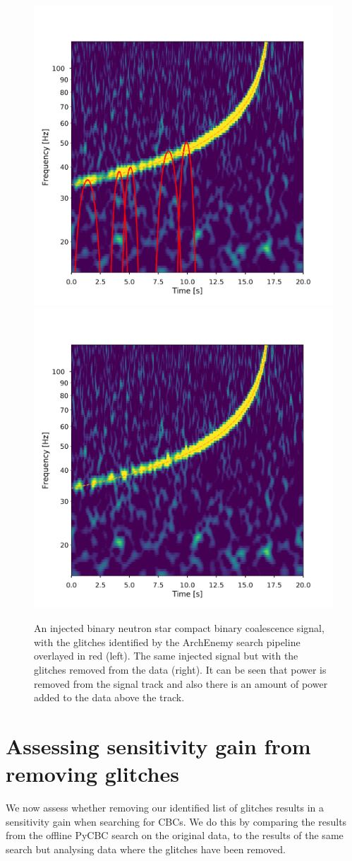 \begin{figure}
  \centering
  \begin{minipage}[t]{1.0\linewidth}
    \includegraphics[width=0.49\linewidth]{images/4_archenemy/Section3/3.8/L1_loud_Original.pdf}
    \hspace{0.02\linewidth}
    \includegraphics[width=0.49\linewidth]{images/4_archenemy/Section3/3.8/L1_loud_Subtracted.pdf}
  \end{minipage}
    \caption{An injected binary neutron star compact binary coalescence \gw{} signal, with the \scl{} glitches identified by the ArchEnemy search pipeline overlayed in red (left). The same injected signal but with the \scl{} glitches removed from the data (right). It can be seen that power is removed from the signal track and also there is an amount of power added to the data above the track.}
    \label{4:fig:loud_inj}
\end{figure}

\section{\label{4:sec:results}Assessing sensitivity gain from removing \scl{} glitches}

We now assess whether removing our identified list of \scl{} glitches results in a sensitivity gain when searching for CBCs. We do this by comparing the results from the offline PyCBC search on the original data, to the results of the same search but analysing data where the glitches have been removed.

